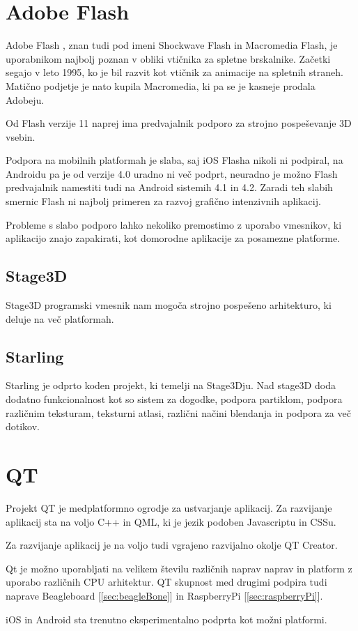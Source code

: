 \section{Adobe Flash}

Adobe Flash \cite{flash}, znan tudi pod imeni Shockwave Flash in Macromedia Flash, je uporabnikom najbolj poznan v obliki vtičnika za spletne brskalnike. Začetki segajo v leto 1995, ko je bil razvit kot vtičnik za animacije na spletnih straneh. Matično podjetje je nato kupila Macromedia, ki pa se je kasneje prodala Adobeju.   

Od Flash verzije 11 naprej ima predvajalnik podporo za strojno pospeševanje 3D vsebin.

Podpora na mobilnih platformah je slaba, saj iOS Flasha nikoli ni podpiral, na Androidu pa je od verzije 4.0 uradno ni več podprt, neuradno je možno Flash predvajalnik namestiti tudi na Android sistemih 4.1 in 4.2. Zaradi teh slabih smernic Flash ni najbolj primeren za razvoj grafično intenzivnih aplikacij.

Probleme s slabo podporo lahko nekoliko premostimo z uporabo vmesnikov, ki aplikacijo znajo zapakirati, kot domorodne aplikacije za posamezne platforme.

\subsection{Stage3D}

Stage3D programski vmesnik nam mogoča strojno pospešeno arhitekturo, ki deluje na več platformah. 

\subsection{Starling}

Starling je odprto koden projekt, ki temelji na Stage3Dju. Nad stage3D doda dodatno funkcionalnost kot so sistem za dogodke, podpora partiklom, podpora različnim teksturam, teksturni atlasi, različni načini blendanja in podpora za več dotikov.

\section{QT}
\label{sec:qt}

Projekt QT je medplatformno ogrodje za ustvarjanje aplikacij. Za razvijanje aplikacij sta na voljo C++ in QML, ki je jezik podoben Javascriptu in CSSu.

Za razvijanje aplikacij je na voljo tudi vgrajeno razvijalno okolje QT Creator.

Qt je možno uporabljati na velikem številu različnih naprav naprav in platform z uporabo različnih CPU arhitektur. QT skupnost med drugimi podpira tudi naprave Beagleboard [\ref{sec:beagleBone}] in RaspberryPi [\ref{sec:raspberryPi}]. 

iOS in Android sta trenutno eksperimentalno podprta kot možni platformi.%